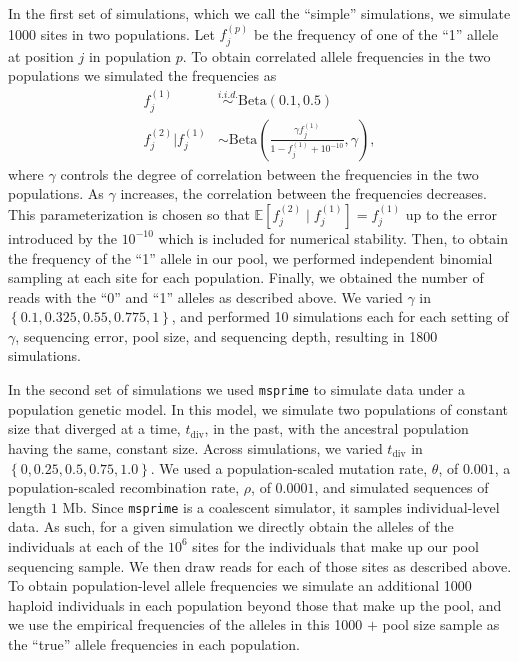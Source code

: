 \documentclass[letterpaper,fontsize=9pt,DIV=12]{scrartcl}
\begin{document}
In the first set of simulations, which we call the ``simple'' simulations, we simulate 1000 sites in two populations.  Let $f_j^{(p)}$ be the frequency of one of the ``1'' allele at position $j$ in population $p$.  To obtain correlated allele frequencies in the two populations we simulated the frequencies as
\begin{align*}
f_j^{(1)} &\overset{i.i.d.}{\sim} \text{Beta}(0.1, 0.5) \\
f_j^{(2)} | f_j^{(1)} &\sim \text{Beta}\left(\frac{\gamma f^{(1)}_j}{1-f^{(1)}_j+10^{-10}}, \gamma\right),
\end{align*}
where $\gamma$ controls the degree of correlation between the frequencies in the two populations.  As $\gamma$ increases, the correlation between the frequencies decreases.  This parameterization is chosen so that $\mathbb{E}\left[f_j^{(2)} \mid f_j^{(1)}\right] = f_j^{(1)}$ up to the error introduced by the $10^{-10}$ which is included for numerical stability.  Then, to obtain the frequency of the ``1'' allele in our pool, we performed independent binomial sampling at each site for each population.  Finally, we obtained the number of reads with the ``0'' and ``1'' alleles as described above.  We varied $\gamma$ in $\left\{0.1, 0.325, 0.55, 0.775, 1\right\}$, and performed 10 simulations each for each setting of $\gamma$, sequencing error, pool size, and sequencing depth, resulting in 1800 simulations.

In the second set of simulations we used \texttt{msprime} \citep{baumdicker2022efficient,kelleher2016efficient} to simulate data under a population genetic model.  In this model, we simulate two populations of constant size that diverged at a time, $t_\text{div}$, in the past, with the ancestral population having the same, constant size.  Across simulations, we varied $t_\text{div}$ in $\left\{0, 0.25, 0.5, 0.75, 1.0\right\}$.  We used a population-scaled mutation rate, $\theta$, of $0.001$, a population-scaled recombination rate, $\rho$, of $0.0001$, and simulated sequences of length $1$ Mb.  Since \texttt{msprime} is a coalescent simulator, it samples individual-level data.  As such, for a given simulation we directly obtain the alleles of the individuals at each of the $10^6$ sites for the individuals that make up our pool sequencing sample.  We then draw reads for each of those sites as described above.  To obtain population-level allele frequencies we simulate an additional 1000 haploid individuals in each population beyond those that make up the pool, and we use the empirical frequencies of the alleles in this 1000 $+$ pool size sample as the ``true'' allele frequencies in each population.
\end{document}
